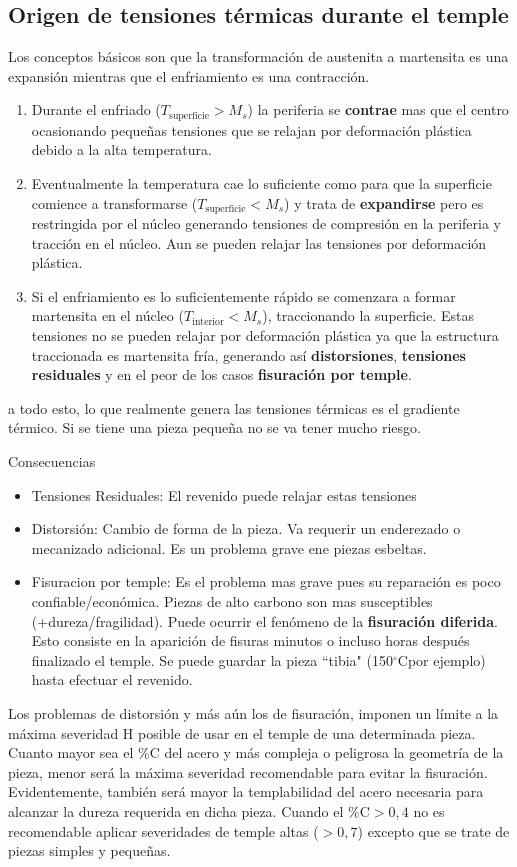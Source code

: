 \documentclass{article}
\newcommand{\grad}{\ensuremath{^\circ \mathrm{C}}}
\begin{document}
\subsection{Origen de tensiones térmicas durante el temple}
Los conceptos básicos son que la transformación de austenita a martensita es una expansión mientras que el enfriamiento es una contracción. 
\begin{enumerate}
    \item Durante el enfriado ($T_{\mathrm{superficie}}>M_s$) la periferia se \textbf{contrae} mas que el centro ocasionando pequeñas tensiones que se relajan por deformación plástica debido a la alta temperatura. 
    \item Eventualmente la temperatura cae lo suficiente como para que la superficie comience a transformarse ($T_{\mathrm{superficie}}<M_s$) y trata de \textbf{expandirse} pero es restringida por el núcleo generando tensiones de compresión en la periferia y tracción en el núcleo. Aun se pueden relajar las tensiones por deformación plástica.
    \item Si el enfriamiento es lo suficientemente rápido se comenzara a formar martensita en el núcleo ($T_{\mathrm{interior}}<M_s$), traccionando la superficie. Estas tensiones no se pueden relajar por deformación plástica ya que la estructura traccionada es martensita fría, generando así \textbf{distorsiones}, \textbf{tensiones residuales} y en el peor de los casos \textbf{fisuración por temple}.
\end{enumerate}
a todo esto, lo que realmente genera las tensiones térmicas es el gradiente térmico. Si se tiene una pieza pequeña no se va tener mucho riesgo.

Consecuencias
\begin{itemize}
    \item Tensiones Residuales: El revenido puede relajar estas tensiones
    \item Distorsión: Cambio de forma de la pieza. Va requerir un enderezado o mecanizado adicional. Es un problema grave ene piezas esbeltas.
    \item Fisuracion por temple: Es el problema mas grave pues su reparación es poco confiable/económica. Piezas de alto carbono son mas susceptibles (+dureza/fragilidad). Puede ocurrir el fenómeno de la \textbf{fisuración diferida}. Esto consiste en la aparición de fisuras minutos o incluso horas después finalizado el temple. Se puede guardar la pieza ``tibia" (150\grad por ejemplo) hasta efectuar el revenido.
\end{itemize}
Los problemas de distorsión y más aún los de fisuración, imponen un límite a la máxima severidad H posible de usar en el temple de una determinada pieza. Cuanto mayor sea el \%C del acero y más compleja o peligrosa la geometría de la pieza, menor será la máxima severidad recomendable para evitar la fisuración. Evidentemente, también será mayor la templabilidad del acero necesaria para alcanzar la dureza requerida en dicha pieza.
Cuando el \%C$>0,4$ no es recomendable aplicar severidades de temple altas ($>0,7$) excepto que se trate de piezas simples y pequeñas.
\end{document}
